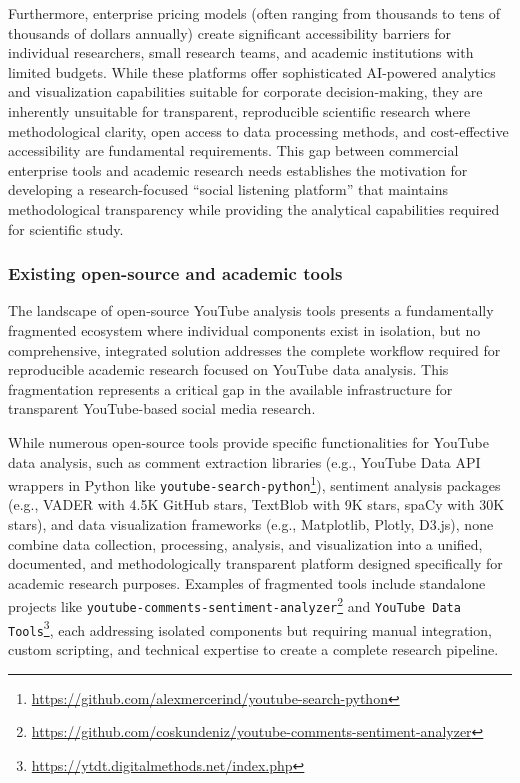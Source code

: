 Furthermore, enterprise pricing models (often ranging from thousands to tens of thousands of dollars annually) create significant accessibility barriers for individual researchers, small research teams, and academic institutions with limited budgets. While these platforms offer sophisticated AI-powered analytics and visualization capabilities suitable for corporate decision-making, they are inherently unsuitable for transparent, reproducible scientific research where methodological clarity, open access to data processing methods, and cost-effective accessibility are fundamental requirements. This gap between commercial enterprise tools and academic research needs establishes the motivation for developing a research-focused \enquote{social listening platform} that maintains methodological transparency while providing the analytical capabilities required for scientific study.

\subsubsection{Existing open-source and academic tools}

The landscape of open-source YouTube analysis tools presents a fundamentally fragmented ecosystem where individual components exist in isolation, but no comprehensive, integrated solution addresses the complete workflow required for reproducible academic research focused on YouTube data analysis. This fragmentation represents a critical gap in the available infrastructure for transparent YouTube-based social media research.

While numerous open-source tools provide specific functionalities for YouTube data analysis, such as comment extraction libraries (e.g., YouTube Data API wrappers in Python like \texttt{youtube-search-python}\footnote{\url{https://github.com/alexmercerind/youtube-search-python}}), sentiment analysis packages (e.g., VADER with 4.5K GitHub stars, TextBlob with 9K stars, spaCy with 30K stars), and data visualization frameworks (e.g., Matplotlib, Plotly, D3.js), none combine data collection, processing, analysis, and visualization into a unified, documented, and methodologically transparent platform designed specifically for academic research purposes. Examples of fragmented tools include standalone projects like \texttt{youtube-comments-sentiment-analyzer}\footnote{\url{https://github.com/coskundeniz/youtube-comments-sentiment-analyzer}} and \texttt{YouTube Data Tools}\footnote{\url{https://ytdt.digitalmethods.net/index.php}}, each addressing isolated components but requiring manual integration, custom scripting, and technical expertise to create a complete research pipeline.

